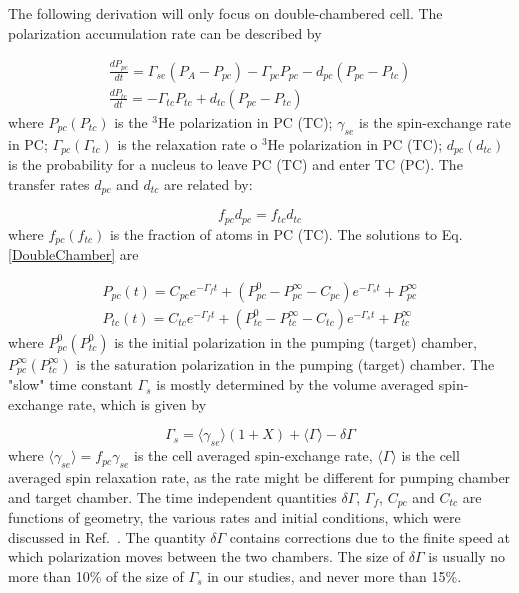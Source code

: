 The following derivation will only focus on double-chambered cell. The polarization accumulation rate can be described by 

\begin{subequations}\label{DoubleChamber}
	\begin{gather}
	\frac{dP_{pc}}{dt}=\Gamma_{se}(P_{A}-P_{pc})-\Gamma_{pc}P_{pc}-d_{pc}(P_{pc}-P_{tc})\\
	\frac{dP_{tc}}{dt}=-\Gamma_{tc}P_{tc}+d_{tc}(P_{pc}-P_{tc})
	\end{gather}
\end{subequations}
where $P_{pc} (P_{tc})$ is the $^{3}$He polarization in PC (TC); $\gamma_{se}$ is the spin-exchange rate in PC; $\Gamma_{pc} (\Gamma_{tc})$  is the relaxation rate o $^{3}$He polarization in PC (TC); $d_{pc} (d_{tc})$ is the probability for a nucleus to leave PC (TC) and enter TC (PC). The transfer rates $d_{pc}$ and $d_{tc}$ are related by:

\begin{equation}
f_{pc}d_{pc}=f_{tc}d_{tc}
\end{equation}
where $f_{pc} (f_{tc})$ is the fraction of atoms in PC (TC). The solutions to Eq.\ref{DoubleChamber} are

\begin{subequations}\label{DoubleChamberSolution}
	\begin{gather}
	P_{pc}(t)=C_{pc}e^{-\Gamma_{f}t}+(P_{pc}^{0}-P_{pc}^{\infty}-C_{pc})e^{-\Gamma_{s}t}+P_{pc}^{\infty}\\
	P_{tc}(t)=C_{tc}e^{-\Gamma_{f}t}+(P_{tc}^{0}-P_{tc}^{\infty}-C_{tc})e^{-\Gamma_{s}t}+P_{tc}^{\infty}
	\end{gather}
\end{subequations}
where $P_{pc}^{0} (P_{tc}^{0})$ is the initial polarization in the pumping (target) chamber, $P_{pc}^{\infty} (P_{tc}^{\infty})$ is the saturation polarization in the pumping (target) chamber. The "slow" time constant $\Gamma_{s}$ is mostly determined by the volume averaged spin-exchange rate, which is given by

\begin{equation}
\Gamma_{s}=\langle \gamma_{se}\rangle(1+X)+\langle\Gamma\rangle-\delta\Gamma
\end{equation}
where $\langle\gamma_{se}\rangle=f_{pc}\gamma_{se}$ is the cell averaged spin-exchange rate, $\langle\Gamma\rangle$ is the cell averaged spin relaxation rate, as the rate might be different for pumping chamber and target chamber. The time independent quantities $\delta \Gamma$, $\Gamma_f$, $C_{pc}$ and $C_{tc}$ are functions of geometry, the various rates and initial conditions, which were discussed in Ref.~\cite{PhysRevC.84.065201}. The quantity $\delta\Gamma$ contains corrections due to the finite speed at which polarization moves between the two chambers. The size of $\delta\Gamma$ is usually no more than 10\% of the size of $\Gamma_{s}$ in our studies, and never more than 15\%.


